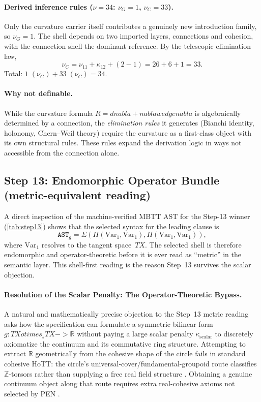 \documentclass[11pt,a4paper]{article}
\def\to{->}%
\def\otimes{otimes}%
\def\nabla{nabla}%
\def\wedge{wedge}%
\theoremstyle{plain}
\theoremstyle{definition}
\theoremstyle{remark}
\newcommand{\R}{\mathbb{R}}
\begin{document}
\paragraph{Derived inference rules ($\nu = 34$: $\nu_G = 1$, $\nu_C = 33$).}
Only the curvature carrier itself contributes a genuinely new introduction family, so $\nu_G = 1$.
The shell depends on two imported layers, connections and cohesion, with the connection shell the dominant reference. By the telescopic elimination law,
\[
  \nu_C = \nu_{11} + \kappa_{12} + (2-1) = 26 + 6 + 1 = 33.
\]
Total: $1\;(\nu_G) + 33\;(\nu_C) = 34$.

\paragraph{Why not definable.}
While the curvature formula $R = d\nabla + \nabla \wedge \nabla$ is algebraically determined by a connection, the \emph{elimination rules} it generates (Bianchi identity, holonomy, Chern--Weil theory) require the curvature as a first-class object with its own structural rules.
These rules expand the derivation logic in ways not accessible from the connection alone.

\subsection{\texorpdfstring{Step 13: Endomorphic Operator Bundle (metric-equivalent reading)}{Step 13: Endomorphic Operator Bundle (metric-equivalent reading)}}
\label{app:metric-spec}

A direct inspection of the machine-verified MBTT AST for the Step-13 winner (\cref{tab:step13}) shows that the selected syntax for the leading clause is
\[
  \mathtt{AST}_g = \Sigma(\Pi(\mathrm{Var}_1, \mathrm{Var}_1), \Pi(\mathrm{Var}_1, \mathrm{Var}_1)),
\]
where $\mathrm{Var}_1$ resolves to the tangent space~$TX$.
The selected shell is therefore endomorphic and operator-theoretic before it is ever read as ``metric'' in the semantic layer.
This shell-first reading is the reason Step~13 survives the scalar objection.

\paragraph{Resolution of the Scalar Penalty: The Operator-Theoretic Bypass.}
A natural and mathematically precise objection to the Step~13 metric reading asks how the specification can formulate a symmetric bilinear form $g : TX \otimes_s TX \to \R$ without paying a large scalar penalty $\kappa_{\mathrm{scalar}}$ to discretely axiomatize the continuum and its commutative ring structure.
Attempting to extract $\R$ geometrically from the cohesive shape of the circle fails in standard cohesive HoTT: the circle's universal-cover/fundamental-groupoid route classifies $\mathbb{Z}$-torsors rather than supplying a free real field structure \cite{licata-shulman}.
Obtaining a genuine continuum object along that route requires extra real-cohesive axioms not selected by PEN \cite{shulman-real-cohesive}.
\end{document}
